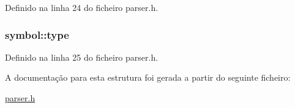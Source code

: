 Definido na linha 24 do ficheiro parser.\-h.

\hypertarget{structsymbol_adba0eaeb4bfbf4787bd3899e4202cc90}{
\subsubsection[{type}]{ symbol\-::type}}\label{structsymbol_adba0eaeb4bfbf4787bd3899e4202cc90}


Definido na linha 25 do ficheiro parser.\-h.



A documentação para esta estrutura foi gerada a partir do seguinte ficheiro\-:\begin{DoxyCompactItemize}
\item 
\hyperlink{parser_8h}{parser.\-h}\end{DoxyCompactItemize}
